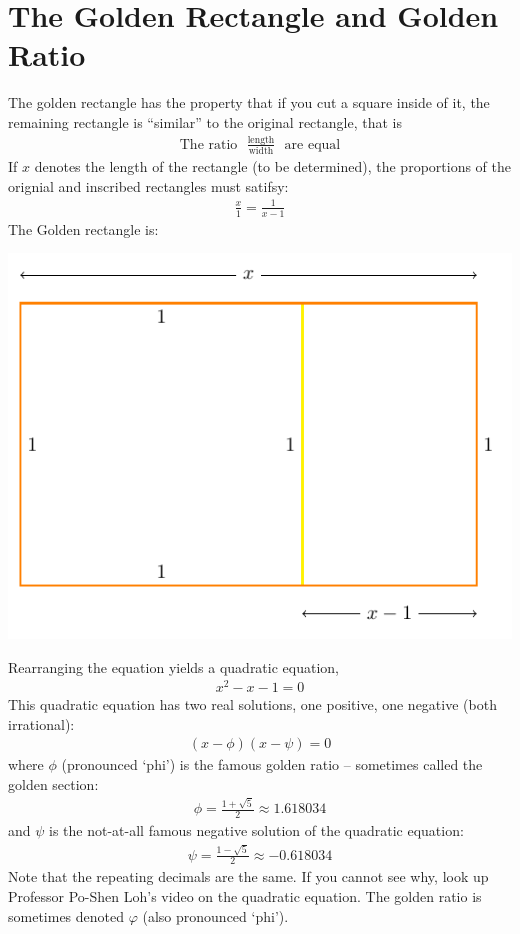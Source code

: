 \documentclass[12pt]{article}
\begin{document}
\section{The Golden Rectangle and Golden Ratio}
The golden rectangle has the property that if you cut a square inside of it, the remaining rectangle is ``similar'' to the original rectangle, that is 
\begin{align*}
\text{The ratio}~~~ \frac{\text{length}}{\text{width}} ~~~\text{are equal}
\end{align*}
If $x$ denotes the length of the rectangle (to be determined), the proportions of the orignial and inscribed rectangles must satifsy:
\begin{align*}
\frac{x}{1} = \frac{1}{x-1}
\end{align*}
The Golden rectangle is:
\begin{center}
\includegraphics{tikz-rectangle-golden}
\end{center}
Rearranging the equation yields a quadratic equation,
\begin{align*}
x^2 - x - 1 = 0
\end{align*}
This quadratic equation has two real solutions, one positive, one negative (both irrational):
\begin{align*}
(x-\phi) (x-\psi) = 0
\end{align*}
where $\phi$ (pronounced `phi') is the famous golden ratio -- sometimes called the golden section:
\begin{align*}
\phi = \frac{1+\sqrt{5}}{2} \approx 1.618034
\end{align*}
and $\psi$ is the not-at-all famous negative solution of the quadratic equation:
\begin{align*}
\psi = \frac{1-\sqrt{5}}{2} \approx -0.618034
\end{align*}
Note that the repeating decimals are the same. If you cannot see why, look up Professor Po-Shen Loh's video on the quadratic equation. The golden ratio is sometimes denoted $\varphi$ (also pronounced `phi'). 
\end{document}
